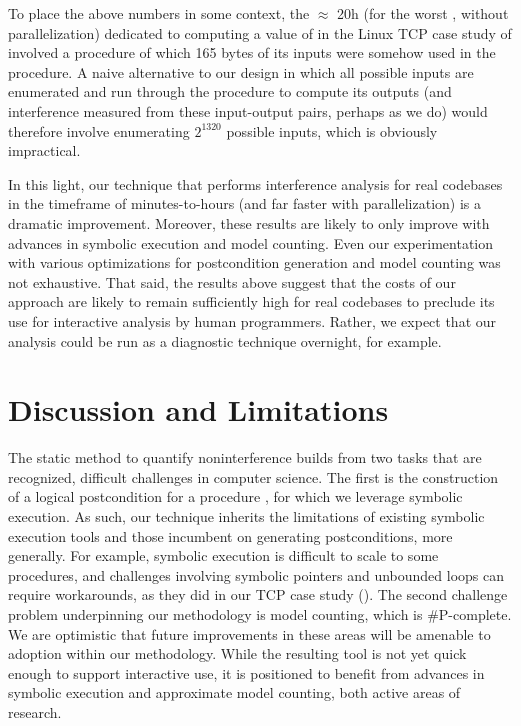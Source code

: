 
To place the above numbers in some context, the $\approx$ 20h (for the
worst \secretsSetSize, without parallelization) dedicated to computing
a value of \Jaccard{\secretsSetSize} in the Linux TCP case study of
 involved a procedure \proc of which 165
bytes of its inputs were somehow used in the procedure.  A naive
alternative to our design in which all possible inputs are enumerated
and run through the procedure to compute its outputs (and interference
measured from these input-output pairs, perhaps as we do) would
therefore involve enumerating $2^{1320}$ possible inputs, which is
obviously impractical.

In this light, our technique that performs interference analysis for
real codebases in the timeframe of minutes-to-hours (and far faster
with parallelization) is a dramatic improvement.  Moreover, these
results are likely to only improve with advances in symbolic execution
and model counting.  Even our experimentation with various
optimizations for postcondition generation and model counting was not
exhaustive.  That said, the results above suggest that the costs of
our approach are likely to remain sufficiently high for real codebases
to preclude its use for interactive analysis by human programmers.
Rather, we expect that our analysis could be run as a diagnostic
technique overnight, for example.

\section{Discussion and Limitations}
\label{sscf:sec:discussion}
The static method to quantify noninterference builds from two tasks
that are recognized, difficult challenges in computer science.  The
first is the construction of a logical postcondition
\postcondition{\proc}{} for a procedure \proc, for which we leverage
symbolic execution.  As such, our technique inherits the limitations
of existing symbolic execution tools and those incumbent on generating
postconditions, more generally.  For example, symbolic execution is
difficult to scale to some procedures, and challenges involving
symbolic pointers and unbounded loops can require workarounds, as they
did in our TCP case study ().  The second
challenge problem underpinning our methodology is model counting,
which is \#P-complete. We are optimistic that future improvements in
these areas will be amenable to adoption within our methodology. While
the resulting tool is not yet quick enough to support interactive use,
it is positioned to benefit from advances in symbolic execution and
approximate model counting, both active areas of research.

